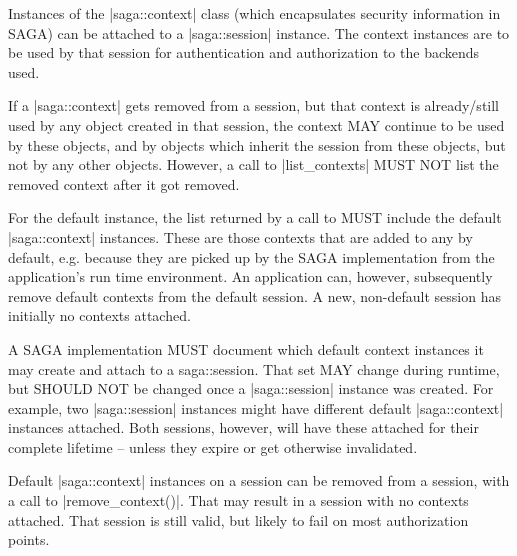     
 
    Instances of the |saga::context| class (which encapsulates
    security information in SAGA) can be attached to a
    |saga::session| instance.  The context instances are to be
    used by that session for authentication and authorization to
     the backends used.
 
    If a |saga::context| gets removed from a session, but that
    context is already/still used by any object created in that
    session, the context MAY continue to be used by these
    objects, and by objects which inherit the session from these
    objects, but not by any other objects.  However, a call to
    |list_contexts| MUST NOT list the removed context after it
    got removed.
 
    For the default  instance,  the list
    returned by a call to  MUST include the
    default |saga::context| instances.  These are those
    contexts that are added to any  by default,
    e.g. because they are picked up by the SAGA implementation
    from the application's run time environment. An application
    can, however, subsequently remove default contexts from the
    default session.  A new, non-default session has initially
    no contexts attached.
 
    A SAGA implementation MUST document which default context
    instances it may create and attach to a saga::session.  That
    set MAY change during runtime, but SHOULD NOT be
    changed once a |saga::session| instance was created.
    For example, two |saga::session| instances might
    have different default |saga::context| instances attached.
    Both sessions, however, will have these attached for their
    complete lifetime  -- unless they expire or get
    otherwise invalidated.
 
    Default |saga::context| instances on a session can be
    removed from a session, with a call to |remove_context()|.
    That may result in a session with no contexts attached.
    That session is still valid, but likely to fail on
    most authorization points.
 
